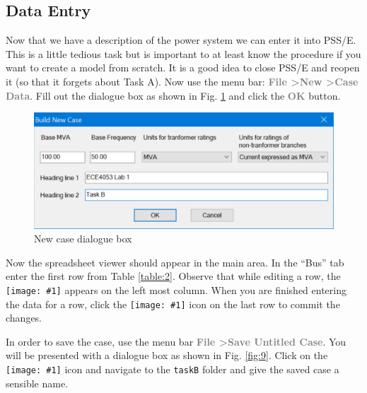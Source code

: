 \documentclass[paper=a4, fontsize=11pt]{article}
\newcommand{\mychar}[1]{%
  \begingroup\normalfont
  \texttt{[image: \#1]}%
  \endgroup
}
\begin{document}
\subsection{Data Entry}
Now that we have a description of the power system we can enter it into PSS/E. This is a little tedious task but is important to at least know the procedure if you want to create a model from scratch. It is a good idea to close PSS/E and reopen it (so that it forgets about Task A). Now use the menu bar: \textbf{\textcolor{gray}{File \textgreater \phantom{ }New \textgreater \phantom{ }Case Data}}.  Fill out the dialogue box as shown in Fig. \ref{fig:8} and click the \textbf{\textcolor{gray}{OK}} button.

\begin{figure}[h]
\centering
\includegraphics[scale=0.32]{fig8_newcase.pdf}
\caption{New case dialogue box}
\label{fig:8}
\end{figure}

Now the spreadsheet viewer should appear in the main area. In the ``Bus'' tab enter the first row from Table \ref{table:2}. Observe that while editing a row, the \mychar{pencil.png} appears on the left most column. When you are finished entering the data for a row, click the \mychar{star.png} icon on the last row to commit the changes.

In order to save the case, use the menu bar \textbf{\textcolor{gray}{File \textgreater \phantom{ }Save Untitled Case}}. You will be presented with a dialogue box as shown in Fig. \ref{fig:9}. Click on the \mychar{browse.png} icon and navigate to the \texttt{taskB} folder and give the saved case a sensible name.
\end{document}

